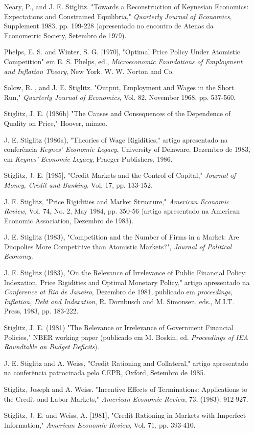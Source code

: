 \documentclass[12pt]{article}
\begin{document}
Neary, P., and J. E. Stiglitz. "Towards a Reconstruction of Keynesian Economics: Expectations and Constrained Equilibria," \textit{Quarterly Journal of Economics}, Supplement 1983, pp. 199-228 (apresentado no encontro de Atenas da Econometric Society, Setembro de 1979).

Phelps, E. S. and Winter, S. G. [1970], "Optimal Price Policy Under Atomistic Competition" em E. S. Phelps, ed., \textit{Microeconomic Foundations of Employment and Inflation Theory}, New York. W. W. Norton and Co.

Solow, R. , and J. E. Stiglitz. "Output, Employment and Wages in the Short Run," \textit{Quarterly Journal of Economics}, Vol. 82, November 1968, pp. 537-560.

Stiglitz, J. E. (1986b) "The Causes and Consequences of the Dependence of Quality on Price," Hoover, mimeo.

J. E. Stiglitz (1986a), "Theories of Wage Rigidities," artigo apresentado na conferência \textit{Keynes' Economic Legacy}, University of Delaware, Dezembro de 1983, em \textit{Keynes' Economic Legacy}, Praeger Publishers, 1986.

Stiglitz, J. E. [1985], "Credit Markets and the Control of Capital," \textit{Journal of Money, Credit and Banking}, Vol. 17, pp. 133-152.

J. E. Stiglitz, "Price Rigidities and Market Structure," \textit{American Economic Review}, Vol. 74, No. 2, May 1984, pp. 350-56 (artigo apresentado na American Economic Association, Dezembro de 1983).

J. E. Stiglitz (1983), "Competition and the Number of Firms in a Market: Are Duopolies More Competitive than Atomistic Markets?", \textit{Journal of Political Economy}.

J. E. Stiglitz (1983), "On the Relevance of Irrelevance of Public Financial Policy: Indexation, Price Rigidities and Optimal Monetary Policy," artigo apresentado na \textit{Conference at Rio de Janeiro}, Dezembro de 1981, publicado em \textit{proceedings, Inflation, Debt and Indexation}, R. Dornbusch and M. Simonsen, eds., M.I.T. Press, 1983, pp. 183-222.

Stiglitz, J. E. (1981) "The Relevance or Irrelevance of Government Financial Policies," NBER working paper (publicado em M. Boskin, ed. \textit{Proceedings of IEA Roundtable on Budget Deficits}).

J. E. Stiglitz and A. Weiss, "Credit Rationing and Collateral," artigo apresentado na conferência patrocinada pelo CEPR, Oxford, Setembro de 1985.

Stiglitz, Joseph and A. Weiss. "Incentive Effects of Terminations: Applications to the Credit and Labor Markets," \textit{American Economic Review}, 73, (1983): 912-927.

Stiglitz, J. E. and Weiss, A. [1981], "Credit Rationing in Markets with Imperfect Information," \textit{American Economic Review}, Vol. 71, pp. 393-410.
\end{document}
